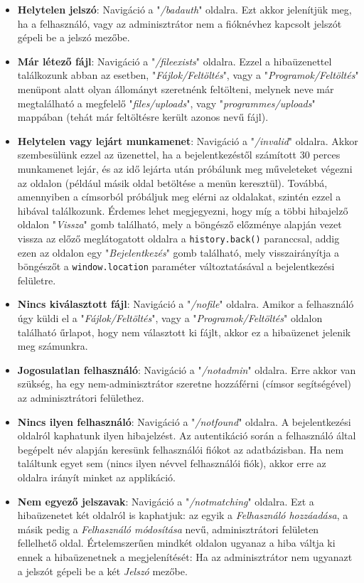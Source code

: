 \begin{itemize}
\item{\textbf{Helytelen jelszó}: Navigáció a "\textit{/badauth}" oldalra. Ezt akkor jelenítjük meg, ha a felhasználó, vagy az adminisztrátor nem a fióknévhez kapcsolt jelszót gépeli be a jelszó mezőbe.}
\item{\textbf{Már létező fájl}: Navigáció a "\textit{/fileexists}" oldalra. Ezzel a hibaüzenettel találkozunk abban az esetben, "\textit{Fájlok/Feltöltés}", vagy a "\textit{Programok/Feltöltés}" menüpont alatt olyan állományt szeretnénk feltölteni, melynek neve már megtalálható a megfelelő "\textit{files/uploads}", vagy "\textit{programmes/uploads}" mappában (tehát már feltöltésre került azonos nevű fájl).}
\item{\textbf{Helytelen vagy lejárt munkamenet}: Navigáció a "\textit{/invalid}" oldalra. Akkor szembesülünk ezzel az üzenettel, ha a bejelentkezéstől számított 30 perces munkamenet lejár, és az idő lejárta után próbálunk meg műveleteket végezni az oldalon (például másik oldal betöltése a menün keresztül). Továbbá, amennyiben a címsorból próbáljuk meg elérni az oldalakat, szintén ezzel a hibával találkozunk. Érdemes lehet megjegyezni, hogy míg a többi hibajelző oldalon "\textit{Vissza}" gomb található, mely a böngésző előzménye alapján vezet vissza az előző meglátogatott oldalra a \texttt{history.back()} paranccsal, addig ezen az oldalon egy "\textit{Bejelentkezés}" gomb található, mely visszairányítja a böngészőt a \texttt{window.location} paraméter változtatásával a bejelentkezési felületre.}
\item{\textbf{Nincs kiválasztott fájl}: Navigáció a "\textit{/nofile}" oldalra. Amikor a felhasználó úgy küldi el a "\textit{Fájlok/Feltöltés}", vagy a "\textit{Programok/Feltöltés}" oldalon található űrlapot, hogy nem választott ki fájlt, akkor ez a hibaüzenet jelenik meg számunkra.}
\item{\textbf{Jogosulatlan felhasználó}: Navigáció a "\textit{/notadmin}" oldalra. Erre akkor van szükség, ha egy nem-adminisztrátor szeretne hozzáférni (címsor segítségével) az adminisztrátori felülethez.}
\item{\textbf{Nincs ilyen felhasználó}: Navigáció a "\textit{/notfound}" oldalra. A bejelentkezési oldalról kaphatunk ilyen hibajelzést. Az autentikáció során a felhasználó által begépelt név alapján keresünk felhasználói fiókot az adatbázisban. Ha nem találtunk egyet sem (nincs ilyen névvel felhasználói fiók), akkor erre az oldalra irányít minket az applikáció.}
\item{\textbf{Nem egyező jelszavak}: Navigáció a "\textit{/notmatching}" oldalra. Ezt a hibaüzenetet két oldalról is kaphatjuk: az egyik a \textit{Felhasználó hozzáadása}, a másik pedig a \textit{Felhasználó módosítása} nevű, adminisztrátori felületen fellelhető oldal. Értelemszerűen mindkét oldalon ugyanaz a hiba váltja ki ennek a hibaüzenetnek a megjelenítését: Ha az adminisztrátor nem ugyanazt a jelszót gépeli be a két \textit{Jelszó} mezőbe.}

\end{itemize}
